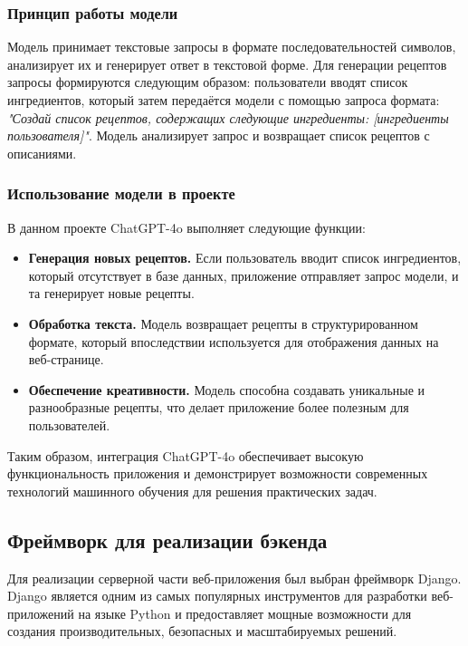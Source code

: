 {{\subsubsection*{Принцип работы модели}
Модель принимает текстовые запросы в формате последовательностей символов, анализирует их и генерирует ответ в текстовой форме. Для генерации рецептов запросы формируются следующим образом: пользователи вводят список ингредиентов, который затем передаётся модели с помощью запроса формата: \textit{"Создай список рецептов, содержащих следующие ингредиенты: [ингредиенты пользователя]"}. Модель анализирует запрос и возвращает список рецептов с описаниями.

\subsubsection*{Использование модели в проекте}
В данном проекте ChatGPT-4o выполняет следующие функции:
\begin{itemize}
    \item \textbf{Генерация новых рецептов.} Если пользователь вводит список ингредиентов, который отсутствует в базе данных, приложение отправляет запрос модели, и та генерирует новые рецепты.
    \item \textbf{Обработка текста.} Модель возвращает рецепты в структурированном формате, который впоследствии используется для отображения данных на веб-странице.
    \item \textbf{Обеспечение креативности.} Модель способна создавать уникальные и разнообразные рецепты, что делает приложение более полезным для пользователей.
\end{itemize}

Таким образом, интеграция ChatGPT-4o обеспечивает высокую функциональность приложения и демонстрирует возможности современных технологий машинного обучения для решения практических задач.

    \subsection{Фреймворк для реализации бэкенда}
    Для реализации серверной части веб-приложения был выбран фреймворк Django. Django является одним из самых популярных инструментов для разработки веб-приложений на языке Python и предоставляет мощные возможности для создания производительных, безопасных и масштабируемых решений.

}}
